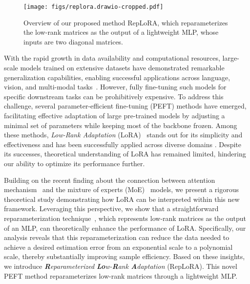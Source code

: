 \begin{figure}
    \centering
    \texttt{[image: figs/replora.drawio-cropped.pdf]}
    \caption{Overview of our proposed method RepLoRA, which reparameterizes the low-rank matrices as the output of a lightweight MLP, whose inputs are two diagonal matrices.}
    \label{fig: overview}
    \vspace{-5mm}
\end{figure}


With the rapid growth in data availability and computational resources, large-scale models trained on extensive datasets have demonstrated remarkable generalization capabilities, enabling successful applications across language, vision, and multi-modal tasks~\cite{dosovitskiy2020image, radford2021learning,llama}. However, fully fine-tuning such models for specific downstream tasks can be prohibitively expensive. To address this challenge, several parameter-efficient fine-tuning (PEFT) methods \cite{ houlsby2019parameter, lester2021powerscaleparameterefficientprompt, jia2022visual} have emerged, facilitating effective adaptation of large pre-trained models by adjusting a minimal set of parameters while keeping most of the backbone frozen. Among these methods, \textit{Low-Rank Adaptation} (LoRA)~\cite{lora} stands out for its simplicity and effectiveness and has been successfully applied across diverse domains \cite{li2022blipbootstrappinglanguageimagepretraining, qin2023chatgptgeneralpurposenaturallanguage, alpaca,  liu2023visualinstructiontuning}. Despite its successes, theoretical understanding of LoRA has remained limited, hindering our ability to optimize its performance further.

Building on the recent finding \cite{moeprompt} about the connection between attention mechanism~\cite{vaswani2017attention} and the mixture of experts (MoE)~\cite{Jacob_Jordan-1991, jordan1994hierarchical} models, we present a rigorous theoretical study demonstrating how LoRA can be interpreted within this new framework. Leveraging this perspective, we show that a straightforward reparameterization technique~\cite{prefix, prefixmoe}, which represents low-rank matrices as the output of an MLP, can theoretically enhance the performance of LoRA. Specifically, our analysis reveals that this reparameterization can reduce the data needed to achieve a desired estimation error from an exponential scale to a polynomial scale, thereby substantially improving sample efficiency. Based on these insights, we introduce \textit{\textbf{R}eparameterized \textbf{Lo}w-\textbf{R}ank \textbf{A}daptation} (RepLoRA). This novel PEFT method reparameterizes low-rank matrices through a lightweight MLP.


